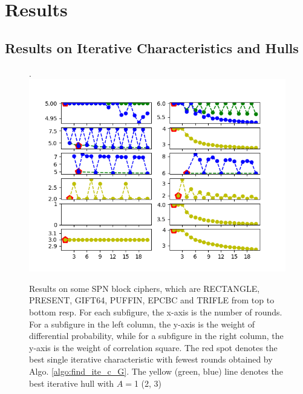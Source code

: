 \section{Results}

\subsection{Results on Iterative Characteristics and Hulls}

\begin{figure}\label{fig:plot_ite}
    \centering
    \caption{Results on some SPN block ciphers, which are RECTANGLE, PRESENT, GIFT64, PUFFIN, EPCBC and TRIFLE from top to bottom resp. For each subfigure, the x-axis is the number of rounds. For a subfigure in the left column, the y-axis is the weight of differential probability, while for a subfigure in the right column, the y-axis is the weight of correlation square. The red spot denotes the best single iterative characteristic with fewest rounds obtained by Algo. \ref{algo:find_ite_c_G}. The yellow (green, blue) line denotes the best iterative hull with $A=$1 (2, 3)}. 
	\includegraphics[width=1\textwidth]{fig/iterative.png}
\end{figure}

